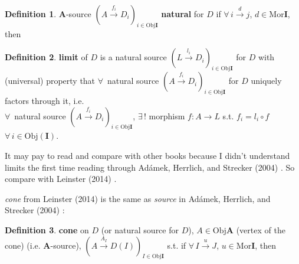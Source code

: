\documentclass[twoside,landscape,10pt]{amsart}
\theoremstyle{plain}
\theoremstyle{definition}
\newtheorem{definition}{Definition}
\theoremstyle{remark}
\begin{document}
\begin{multicols*}{2}
\begin{definition}
  $\mathbf{A}$-source $(A\xrightarrow{f_i}D_i)_{i\in \text{Obj}\mathbf{I}}$ \textbf{natural} for $D$ if $\forall \, i\xrightarrow{ d } j $, $d\in \text{Mor}\mathbf{I}$, then 

\end{definition}

\begin{definition}
 \textbf{ limit } of $D$ is a natural source $(L \xrightarrow{l_i} D_i )_{i\in \text{Obj}\mathbf{I}}$ for $D$ with \\
(universal) property that $\forall \, $ natural source $(A\xrightarrow{f_i} D_i)_{i \in \text{Obj}\mathbf{I}}$ for $D$ uniquely factors through it, i.e. \\
$\forall \, $ natural source $(A\xrightarrow{f_i} D_i)_{i \in \text{Obj}\mathbf{I}}$, $\exists \, !$ morphism $f:A \to L$ s.t. $f_i = l_i \circ f$ \qquad \, $\forall \, i \in \text{Obj}(\mathbf{I})$.  
\end{definition}

It may pay to read and compare with other books because I didn't understand limits the first time reading through Ad\'{a}mek, Herrlich, and Strecker (2004) \cite{AHS2004}.  So compare with Leinster (2014) \cite{Lein2014}.  

\emph{cone} from Leinster (2014) \cite{Lein2014} is the same as \emph{source} in Ad\'{a}mek, Herrlich, and Strecker (2004) \cite{AHS2004}:

\begin{definition}
  \textbf{cone} on $D$ (or natural source for $D$), $A \in \text{Obj}\mathbf{A}$ (vertex of the cone) (i.e. $\mathbf{A}$-source), $(A\xrightarrow{ A_I} D(I))_{I \in \text{Obj}\mathbf{I}}$ s.t. if $\forall \, I \xrightarrow{u} J$, $u\in \text{Mor}\mathbf{I}$, then 



\end{definition}
\end{multicols*}
\end{document}
